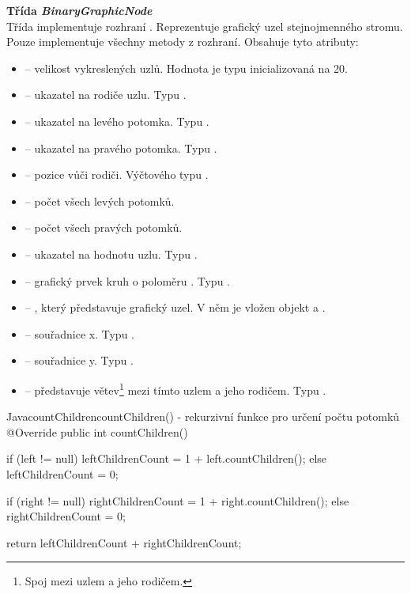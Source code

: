 \documentclass[
  biblatex=false,
  font=serif,
  glossaries=false,
  tables=false,
  theorems=false,
  index
]{kidiplom}
\begin{document}
\noindent \textbf{Třída \textit{BinaryGraphicNode}}\\
\indent Třída implementuje rozhraní . Reprezentuje grafický uzel stejnojmenného stromu. Pouze implementuje všechny metody z rozhraní. Obsahuje tyto atributy:
\begin{itemize}
\item {} -- velikost vykreslených uzlů. Hodnota je typu  inicializovaná na 20.
\item {} -- ukazatel na rodiče uzlu. Typu .
\item {} -- ukazatel na levého potomka. Typu .
\item {} -- ukazatel na pravého potomka. Typu .
\item {} -- pozice vůči rodiči. Výčtového typu .
\item {} -- počet všech levých potomků.
\item {} -- počet všech pravých potomků.
\item {} -- ukazatel na hodnotu uzlu. Typu .
\item {} -- grafický prvek kruh o poloměru . Typu .
\item {} -- , který představuje grafický uzel. V něm je vložen objekt  a .
\item {} -- souřadnice  x. Typu .
\item {} -- souřadnice  y. Typu .
\item {} -- představuje větev\footnote{Spoj mezi uzlem a jeho rodičem.} mezi tímto uzlem a jeho rodičem. Typu .
\end{itemize}

\begin{kicode}{Java}{countChildren}{countChildren() - rekurzivní funkce pro určení počtu potomků}
@Override
public int countChildren() {
	if (left != null) {
		leftChildrenCount = 1 + left.countChildren();
	} else {
		leftChildrenCount = 0;
	}

	if (right != null) {
		rightChildrenCount = 1 + right.countChildren();
	} else {
		rightChildrenCount = 0;
	}
		
	return leftChildrenCount + rightChildrenCount;
}
\end{kicode}
\end{document}

